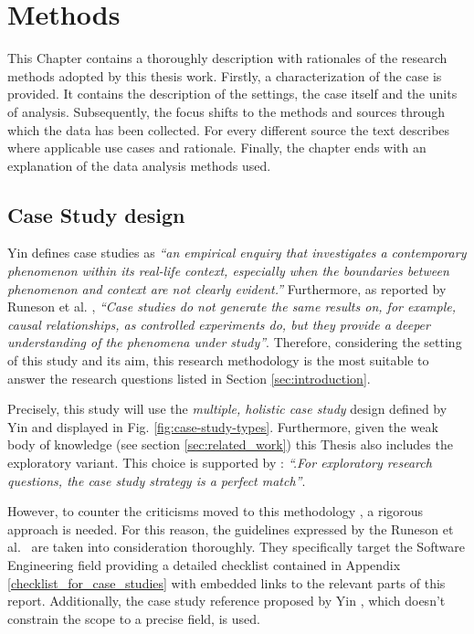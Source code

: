 \chapter{Methods} \label{methods}
This Chapter contains a thoroughly description with rationales of the research methods adopted by this thesis work. Firstly, a characterization of the case is provided. It contains the description of the settings, the case itself and the units of analysis. Subsequently, the focus shifts to the methods and sources through which the data has been collected. For every different source the text describes where applicable use cases and rationale. Finally, the chapter ends with an explanation of the data analysis methods used. 


%
%
%
%
\section{Case Study design}	\label{sec:case-description}
Yin \cite{case_study_guide} defines case studies as \textit{``an empirical enquiry that investigates a contemporary phenomenon within its real-life context, especially when the boundaries between phenomenon and context are not clearly evident.''}
Furthermore, as reported by Runeson et al. \cite[p.~3]{case_study_software_engineering}, \textit{``Case studies do not generate the same results on, for example, causal relationships, as controlled experiments do, but they provide a deeper understanding of the phenomena under study''}. Therefore, considering the setting of this study and its aim, this research methodology is the most suitable to answer the research questions listed in Section \ref{sec:introduction}.

Precisely, this study will use the \textit{multiple, holistic case study} design defined by Yin \cite{case_study_guide} and displayed in Fig. \ref{fig:case-study-types}. Furthermore, given the weak body of knowledge (see section \ref{sec:related_work}) this Thesis also includes the exploratory variant. This choice is supported by \cite[p.~19]{case_study_software_engineering}: \textit{``.For exploratory research questions, the case study strategy is a perfect match''}.

However, to counter the criticisms moved to this methodology \cite[p.~4]{case_study_software_engineering}, a rigorous approach is needed. For this reason, the guidelines expressed by the Runeson et al.\ \cite{case_study_software_engineering} are taken into consideration thoroughly. They specifically target the Software Engineering field providing a detailed checklist contained in Appendix \ref{checklist_for_case_studies} with embedded links to the relevant parts of this report. Additionally, the case study reference proposed by Yin \cite{case_study_guide}, which doesn't constrain the scope to a precise field, is used.


